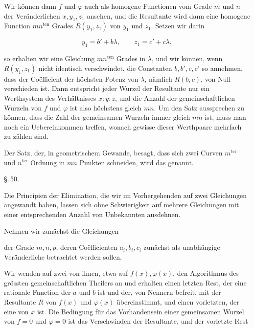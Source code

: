 Wir können dann $f$ und $\varphi$ auch als homogene Functionen
vom Grade $m$ und $n$ der Veränderlichen $x, y_1, z_1$ ansehen, und
die Resultante wird dann eine homogene Function $mn^{\mathrm{ten}}$ Grades
$R(y_1, z_1)$ von $y_1$ und $z_1$. Setzen wir darin

\[
y_1 = b' + b\lambda, \qquad z_1 = c' + c\lambda,
\]

so erhalten wir eine Gleichung $mn^{\mathrm{ten}}$ Grades in $\lambda$, und wir
können, wenn $R(y_1, z_1)$ nicht identisch verschwindet, die Constanten
 $b, b', c, c'$ so annehmen, dass der Co\"efficient der höchsten
Potenz von $\lambda$, nämlich $R(b, c)$, von Null verschieden ist. Dann
entspricht jeder Wurzel der Resultante nur ein Werthsystem
des Verhältnisses $x:y:z$, und die Anzahl der gemeinschaftlichen
Wurzeln von $f$ und $\varphi$ ist also höchstens gleich $mn$. Um den Satz
aussprechen zu können, dass die Zahl der gemeinsamen Wurzeln
immer gleich $mn$ ist, muss man noch ein Uebereinkommen treffen,
wonach gewisse dieser Werthpaare mehrfach zu zählen sind.

Der Satz, der, in geometrischem Gewande, besagt, dass sich
zwei Curven $m^{\mathrm{ter}}$ und $n^{\mathrm{ter}}$ Ordnung in $mn$ Punkten schneiden,
wird das  genannt.

\begin{center}
§.\,50.

\end{center}

Die Principien der Elimination, die wir im Vorhergehenden
auf zwei Gleichungen angewandt haben, lassen sich ohne
Schwierigkeit auf mehrere Gleichungen mit einer entsprechenden
Anzahl von Unbekannten ausdehnen.

Nehmen wir zunächst die Gleichungen


der Grade $m, n, p$, deren Co\"efficienten $a_i, b_i, c_i$ zunächst als
unabhängige Veränderliche betrachtet werden sollen.

Wir wenden auf zwei von ihnen, etwa auf $f(x), \varphi(x)$, den
Algorithmus des grössten gemeinschaftlichen Theilers an und
erhalten einen letzten Rest, der eine rationale Function der $a$
und $b$ ist und der, von Nennern befreit, mit der Resultante $R$
von $f(x)$ und $\varphi(x)$ übereinstimmt, und einen vorletzten, der eine
 von $x$ ist. Die Bedingung für das Vorhandensein
 einer gemeinsamen Wurzel von $f = 0$ und $\varphi = 0$
ist das Verschwinden der Resultante, und der vorletzte Rest
